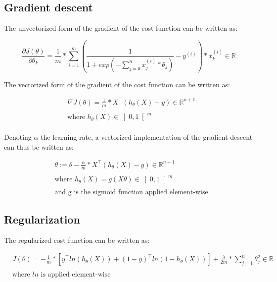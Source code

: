 \documentclass[a4paper, 12pt]{article}
\begin{document}
\subsection{Gradient descent}

The unvectorized form of the gradient of the cost function can be written as:

\begin{equation}
\frac{\partial J(\theta)}{\partial \theta_{k}} = \frac{1}{m} * \sum_{i=1}^{m} \left( \frac{1}{1+exp(-\sum_{j=0}^{n} x_{j}^{(i)}*\theta_{j})} - y^{(i)} \right) * x_{k}^{(i)} \in \mathbb{R}
\end{equation}

The vectorized form of the gradient of the cost function can be written as:

\begin{align*}
& \nabla J(\theta) = \frac{1}{m} * X^{\top}\left( h_{\theta}(X)-y \right) \in \mathbb{R}^{n+1} \\
& \\
& \text{where } h_{\theta}(X) \in \left]0, 1 \right[^{m} \\
\end{align*}

Denoting $\alpha$ the learning rate, a vectorized implementation of the gradient descent can thus be written as:

\begin{align*}
& \theta := \theta - \frac{\alpha}{m} *X^{\top}\left( h_{\theta}(X)-y \right) \in \mathbb{R}^{n+1} \\
& \\
& \text{where } h_{\theta}(X) = g(X\theta ) \in \left] 0, 1 \right[^{m} \\
& \\
& \text{and g is the sigmoid function applied element-wise}
\end{align*}

\subsection{Regularization}

The regularized cost function can be written as:

\begin{align*}
& J(\theta) = -\frac{1}{m} * \left[y^{\top} ln(h_{\theta}(X)) + (1-y)^{\top}ln(1-h_{\theta}(X)) \right] + \frac{\lambda}{2m} * \sum_{j=1}^{n} \theta_{j}^{2} \in \mathbb{R} \\
& \\
& \text{where } ln \text{ is applied element-wise} 
\end{align*}
\end{document}
